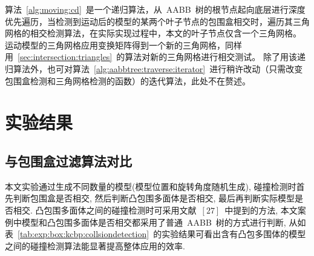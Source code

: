 \begin{algorithm}[htbp]
\end{algorithm}

算法~\ref{alg:moving:cd}~是一个递归算法，从~AABB~树的根节点起向底层进行深度优先遍历，当检测到运动后的模型的某两个叶子节点的包围盒相交时，遍历其三角网格的相交检测算法，在实际实现过程中，本文的叶子节点仅含一个三角网格。
运动模型的三角网格应用变换矩阵得到一个新的三角网格，同样用~\ref{sec:intersection:triangles}~的算法对新的三角网格进行相交测试。
除了用该递归算法外，也可对算法~\ref{alg:aabbtree:traverse:iterator}~进行稍许改动（只需改变包围盒检测和三角网格检测的函数）的迭代算法，此处不在赘述。

\section{实验结果}
\label{sec:exper-cd}

\subsection{与包围盒过滤算法对比}
\label{subsec:exper:box:kcbp}

本文实验通过生成不同数量的模型(模型位置和旋转角度随机生成), 碰撞检测时首先判断包围盒是否相交, 然后判断凸包围多面体是否相交, 最后再判断实际模型是否相交.
凸包围多面体之间的碰撞检测时可采用文献~${[27]}$~中提到的方法,
本文案例中模型和凸包围多面体是否相交都采用了普通~AABB~树的方式进行判断,
从如表~\ref{tab:exp:box:kcbp:collsiondetection}~的实验结果可看出含有凸包多围体的模型之间的碰撞检测算法能显著提高整体应用的效率. 

